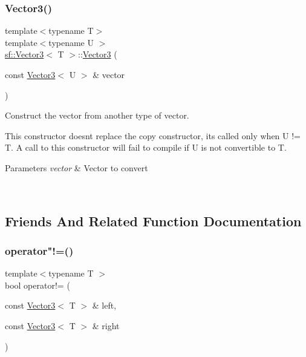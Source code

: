 \subsubsection{\texorpdfstring{Vector3()}{Vector3()}\hspace{0.1cm}{\footnotesize\ttfamily [3/3]}}
{\footnotesize\ttfamily template$<$typename T$>$ \\
template$<$typename U $>$ \\
\mbox{\hyperlink{classsf_1_1_vector3}{sf\+::\+Vector3}}$<$ T $>$\+::\mbox{\hyperlink{classsf_1_1_vector3}{Vector3}} (\begin{DoxyParamCaption}\item[{const \mbox{\hyperlink{classsf_1_1_vector3}{Vector3}}$<$ U $>$ \&}]{vector }\end{DoxyParamCaption})\hspace{0.3cm}{\ttfamily [explicit]}}



Construct the vector from another type of vector. 

This constructor doesn\textquotesingle{}t replace the copy constructor, it\textquotesingle{}s called only when U != T. A call to this constructor will fail to compile if U is not convertible to T.


\begin{DoxyParams}{Parameters}
{\em vector} & Vector to convert \begin{DoxyVerb}\end{DoxyVerb}
 \\
\hline
\end{DoxyParams}


\subsection{Friends And Related Function Documentation}
\mbox{\label{classsf_1_1_vector3_a608500d1ad3b78082cb5bb4356742bd4}} 
\subsubsection{\texorpdfstring{operator"!=()}{operator!=()}}
{\footnotesize\ttfamily template$<$typename T $>$ \\
bool operator!= (\begin{DoxyParamCaption}\item[{const \mbox{\hyperlink{classsf_1_1_vector3}{Vector3}}$<$ T $>$ \&}]{left,  }\item[{const \mbox{\hyperlink{classsf_1_1_vector3}{Vector3}}$<$ T $>$ \&}]{right }\end{DoxyParamCaption})\hspace{0.3cm}{\ttfamily [related]}}




